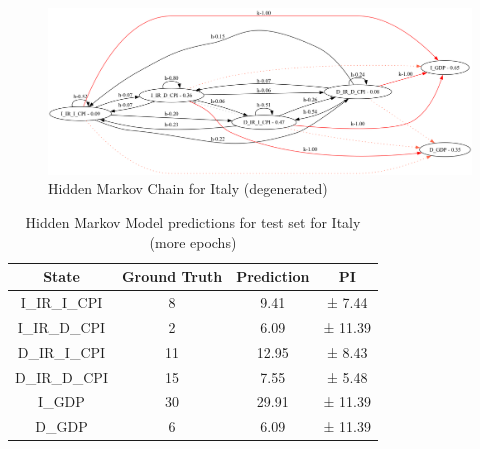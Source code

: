 \begin{figure}[H]
    \centering
    \includegraphics[width=\columnwidth]{imgs/italy_hmm_degenerated.png}
    \caption{Hidden Markov Chain for Italy (degenerated)}
    \label{fig:correlation_us}
\end{figure}





\begin{table}[H]
  \centering
  \begin{tabular}{|c|c|c|c|}
    \hline
    State         & Ground Truth & Prediction & PI      \\
    \hline
    I\_IR\_I\_CPI & 8            & 9.41       & ± 7.44  \\
    I\_IR\_D\_CPI & 2            & 6.09       & ± 11.39 \\
    D\_IR\_I\_CPI & 11           & 12.95      & ± 8.43  \\
    D\_IR\_D\_CPI & 15           & 7.55       & ± 5.48  \\
    I\_GDP        & 30           & 29.91      & ± 11.39 \\
    D\_GDP        & 6            & 6.09       & ± 11.39 \\
    \hline
  \end{tabular}
  \label{tab:italy_test_degen}
  \caption{Hidden Markov Model predictions for test set for Italy (more epochs)}
\end{table}

